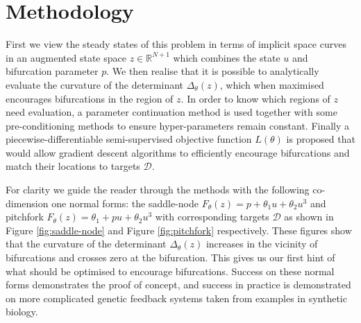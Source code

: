 \documentclass{article}[12pt]
\numberwithin{equation}{section}
\begin{document}
\section{Methodology}
First we view the steady states of this problem in terms of implicit space curves \cite{Goldman2005CurvatureSurfaces} in an augmented state space $z\in \mathbb{R}^{N+1}$ which combines the state $u$ and bifurcation parameter $p$. We then realise that it is possible to analytically evaluate the curvature of the determinant $\Delta_\theta(z)$, which when maximised encourages bifurcations in the region of $z$. In order to know which regions of $z$ need evaluation, a parameter continuation method \cite{Veltz2019PseudoArcLengthContinuation.jl,Farrell2016TheDiagrams} is used together with some pre-conditioning methods to ensure hyper-parameters remain constant. Finally a piecewise-differentiable semi-supervised objective function $L(\theta)$ is proposed that would allow gradient descent algorithms to efficiently encourage bifurcations and match their locations to targets $\mathcal{D}$.

For clarity we guide the reader through the methods with the following co-dimension one normal forms: the saddle-node $F_{\theta}(z) = p + \theta_{1}u+\theta_{2}u^3$ and pitchfork $F_{\theta}(z) = \theta_{1} + p u+\theta_{2}u^3$ with corresponding targets $\mathcal{D}$ as shown in Figure \ref{fig:saddle-node} and Figure \ref{fig:pitchfork} respectively. These figures show that the curvature of the determinant $\Delta_\theta(z)$ increases in the vicinity of bifurcations and crosses zero at the bifurcation. This gives us our first hint of what should be optimised to encourage bifurcations. Success on these normal forms demonstrates the proof of concept, and success in practice is demonstrated on more complicated genetic feedback systems taken from examples in synthetic biology.
\end{document}
